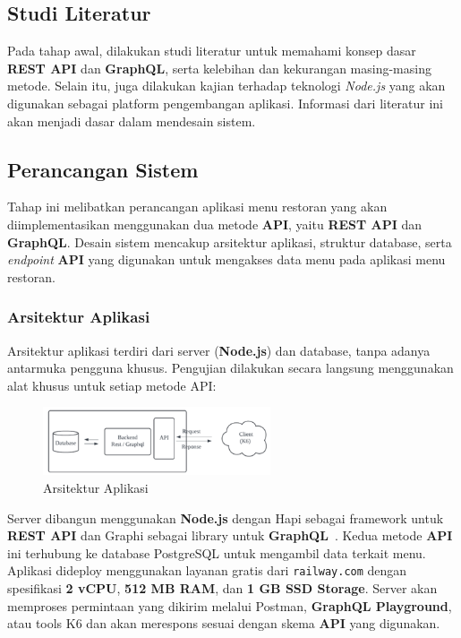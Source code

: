 \documentclass[
 manuscript=article,  %
  layout=publish, 
  year=2024, 
  month= Februari, %
  volume=8,
  number=1 
]{JIKO}
\begin{document}
\subsection{Studi Literatur}

Pada tahap awal, dilakukan studi literatur untuk memahami konsep dasar \textbf{REST API} dan \textbf{GraphQL}, serta kelebihan dan kekurangan masing-masing metode. Selain itu, juga dilakukan kajian terhadap teknologi \textit{Node.js} yang akan digunakan sebagai platform pengembangan aplikasi. Informasi dari literatur ini akan menjadi dasar dalam mendesain sistem.

\subsection{Perancangan Sistem}

Tahap ini melibatkan perancangan aplikasi menu restoran yang akan diimplementasikan menggunakan dua metode \textbf{API}, yaitu \textbf{REST API} dan \textbf{GraphQL}. Desain sistem mencakup arsitektur aplikasi, struktur database, serta \textit{endpoint} \textbf{API} yang digunakan untuk mengakses data menu pada aplikasi menu restoran.


\subsubsection{Arsitektur Aplikasi }

Arsitektur aplikasi terdiri dari server (\textbf{Node.js}) dan database, tanpa adanya antarmuka pengguna khusus. Pengujian dilakukan secara langsung menggunakan alat khusus untuk setiap metode API: 


\renewcommand{\figurename}{Gambar}
\begin{figure}[ht!]
    \begin{center}
        \includegraphics[width=0.6\textwidth]{assets/Picture1.png}
        \caption{Arsitektur Aplikasi}
        \label{fig:logo}
    \end{center}
\end{figure}


Server dibangun menggunakan \textbf{Node.js} dengan Hapi sebagai framework untuk \textbf{REST API} dan Graphi sebagai library untuk \textbf{GraphQL}~\cite{6}. Kedua metode \textbf{API} ini terhubung ke database PostgreSQL untuk mengambil data terkait menu. Aplikasi dideploy menggunakan layanan gratis dari \texttt{railway.com} dengan spesifikasi \textbf{2 vCPU}, \textbf{512 MB RAM}, dan \textbf{1 GB SSD Storage}. Server akan memproses permintaan yang dikirim melalui Postman, \textbf{GraphQL Playground}, atau tools K6 dan akan merespons sesuai dengan skema \textbf{API} yang digunakan.
\end{document}
